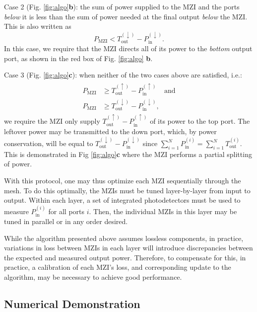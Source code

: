 Case 2 (Fig. \ref{fig:algo}\textbf{b}):  the sum of power supplied to the MZI and the ports \textit{below} it is less than the sum of power needed at the final output \textit{below} the MZI.  This is also written as
\begin{equation}
    P_\textrm{MZI} < T_\textrm{out}^{(\downarrow)} - P_\textrm{in}^{(\downarrow)}.
\end{equation}
In this case, we require that the MZI directs all of its power to the \textit{bottom} output port, as shown in the red box of Fig. \ref{fig:algo} \textbf{b}.

Case 3 (Fig. \ref{fig:algo}\textbf{c}):  when neither of the two cases above are satisfied, i.e.:
\begin{align}
\begin{split}
    P_\textrm{MZI} &\geq T_\textrm{out}^{(\uparrow)} -  P_\textrm{in}^{(\uparrow)} ~~~~~\textrm{and} \\
    P_\textrm{MZI} &\geq T_\textrm{out}^{(\downarrow)} - P_\textrm{in}^{(\downarrow)},
\end{split}
\end{align}
we require the MZI only supply $T_\textrm{out}^{(\uparrow)} - P_\textrm{in}^{(\uparrow)}$ of its power to the top port.  The leftover power may be transmitted to the down port, which, by power conservation, will be equal to $T_\textrm{out}^{(\downarrow)} - P_\textrm{in}^{(\downarrow)}$ since $\sum_{i=1}^{N}P_\textrm{in}^{(i)} = \sum_{i=1}^{N}T_\textrm{out}^{(i)}$.  This is demonstrated in Fig \ref{fig:algo}\textbf{c} where the MZI performs a partial splitting of power.

With this protocol, one may thus optimize each MZI sequentially through the mesh.  To do this optimally, the MZIs must be tuned layer-by-layer from input to output.  Within each layer, a set of integrated photodetectors must be used to measure $P_\textrm{in}^{(i)}$ for all ports $i$.  Then, the individual MZIs in this layer may be tuned in parallel or in any order desired.

While the algorithm presented above assumes lossless components, in practice, variations in loss between MZIs in each layer will introduce discrepancies between the expected and measured output power.  Therefore, to compensate for this, in practice, a calibration of each MZI’s loss, and corresponding update to the algorithm, may be necessary to achieve good performance.

\subsection{\label{sec:demo}Numerical Demonstration}

